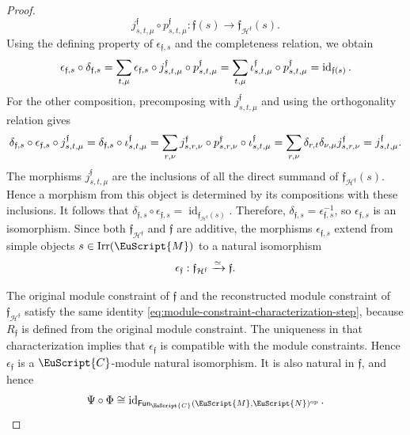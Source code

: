 \documentclass[a4paper,11pt]{article}
\theoremstyle{definition}
\theoremstyle{remark}
\newcommand\eC           {\EuScript{C}}
\newcommand\eM          {\EuScript{M}}
\newcommand\eN         {\EuScript{N}}
\newcommand{\id}{\operatorname{id}}
\newcommand{\Irr}{\operatorname{Irr}}
\newcommand{\Fun}{\mathsf{Fun}}
\begin{document}
\begin{proof}
\begin{equation}
    j^{\mathfrak f}_{s,t,\mu}
    \circ
    p^{\mathfrak f}_{s,t,\mu}:
    \mathfrak f(s)
    \to
    \mathfrak f_{\mathcal H^{\mathfrak f}}(s).
\end{equation}
Using the defining property of $\epsilon_{\mathfrak f,s}$ and the completeness relation, we obtain
\begin{equation}
    \epsilon_{\mathfrak f,s}
    \circ \delta_{\mathfrak f,s} =
    \sum_{t,\mu}
    \epsilon_{\mathfrak f,s}
    \circ j^{\mathfrak f}_{s,t,\mu}
    \circ p^{\mathfrak f}_{s,t,\mu} =
    \sum_{t,\mu}
    \iota^{\mathfrak f}_{s,t,\mu}
    \circ p^{\mathfrak f}_{s,t,\mu} =
    \id_{\mathfrak f(s)}.
    \notag
\end{equation}
For the other composition, precomposing with $j^{\mathfrak f}_{s,t,\mu}$ and using the orthogonality relation gives
\begin{equation}
        \delta_{\mathfrak f,s}
        \circ
        \epsilon_{\mathfrak f,s}
        \circ
        j^{\mathfrak f}_{s,t,\mu} =
        \delta_{\mathfrak f,s}
        \circ
        \iota^{\mathfrak f}_{s,t,\mu}=
        \sum_{r,\nu}
        j^{\mathfrak f}_{s,r,\nu}
        \circ
        p^{\mathfrak f}_{s,r,\nu}
        \circ
        \iota^{\mathfrak f}_{s,t,\mu} =
        \sum_{r,\nu}
        \delta_{r,t}\delta_{\nu,\mu}
        j^{\mathfrak f}_{s,r,\nu} =
        j^{\mathfrak f}_{s,t,\mu}.
    \notag
\end{equation}
The morphisms $j^{\mathfrak f}_{s,t,\mu}$ are the inclusions of all the direct summand of $\mathfrak f_{\mathcal H^{\mathfrak f}}(s)$. Hence a morphism from this object is determined by its compositions with these inclusions. It follows that $\delta_{\mathfrak f,s}\circ\epsilon_{\mathfrak f,s} =\id_{\mathfrak f_{\mathcal H^{\mathfrak f}}(s)}$. Therefore, $\delta_{\mathfrak f,s} = \epsilon_{\mathfrak f,s}^{-1}$, so $\epsilon_{\mathfrak f,s}$ is an isomorphism. Since both $\mathfrak f_{\mathcal H^{\mathfrak f}}$ and $\mathfrak f$ are additive, the morphisms $\epsilon_{\mathfrak f,s}$ extend from simple objects $s\in\Irr(\eM)$ to a natural isomorphism
\begin{equation}
    \notag
    \epsilon_{\mathfrak f}: \mathfrak f_{\mathcal H^{\mathfrak f}} \xrightarrow{\simeq} \mathfrak f.
\end{equation}

The original module constraint of $\mathfrak f$ and the reconstructed
module constraint of
$\mathfrak f_{\mathcal H^{\mathfrak f}}$ satisfy the same identity
\eqref{eq:module-constraint-characterization-step}, because
$R_{\mathfrak f}$ is defined from the original module constraint.
The uniqueness in that characterization implies that
$\epsilon_{\mathfrak f}$ is compatible with the module constraints.
Hence $\epsilon_{\mathfrak f}$ is a $\eC$-module natural isomorphism.
It is also natural in $\mathfrak{f}$, and hence
\begin{equation}
    \notag
    \Psi\circ\Phi
    \cong
    \id_{\Fun_{\eC}(\eM,\eN)^{\rm op}}.
\end{equation}


\end{proof}
\end{document}
